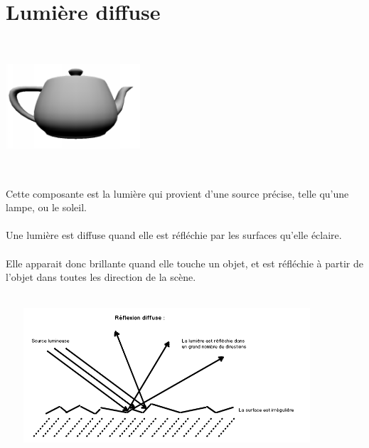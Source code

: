 \section{Lumière diffuse}
\begin{center}
\includegraphics[width=5cm,height=5cm]{pipeline/images/objet_diffuse.png}
\end{center}
Cette composante est la lumière qui provient d'une source précise, telle qu'une lampe, ou le soleil.
\\\\
Une lumière est diffuse quand elle est réfléchie par les surfaces qu'elle éclaire.
\\\\
Elle apparait donc brillante quand elle touche un objet, et est réfléchie à partir de l'objet dans toutes les direction de la scène.
\\\\
\begin{center}
\includegraphics[width=12cm,height=5cm]{pipeline/images/reflexion_diffuse.png}
\end{center}

